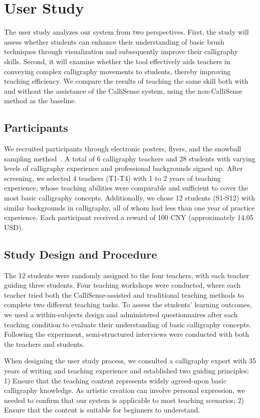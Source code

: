 \section{User Study}
The user study analyzes our system from two perspectives. First, the study will assess whether students can enhance their understanding of basic brush techniques through visualization and subsequently improve their calligraphy skills. Second, it will examine whether the tool effectively aids teachers in conveying complex calligraphy movements to students, thereby improving teaching efficiency. We compare the results of teaching the same skill both with and without the assistance of the CalliSense system, using the non-CalliSense method as the baseline.

\subsection{Participants}
We recruited participants through electronic posters, flyers, and the snowball sampling method~\cite{naderifar2017snowball}. A total of 6 calligraphy teachers and 28 students with varying levels of calligraphy experience and professional backgrounds signed up. After screening, we selected 4 teachers (T1-T4) with 1 to 2 years of teaching experience, whose teaching abilities were comparable and sufficient to cover the most basic calligraphy concepts. Additionally, we chose 12 students (S1-S12) with similar backgrounds in calligraphy, all of whom had less than one year of practice experience. Each participant received a reward of 100 CNY (approximately 14.05 USD).


\subsection{Study Design and Procedure}
The 12 students were randomly assigned to the four teachers, with each teacher guiding three students. Four teaching workshops were conducted, where each teacher tried both the CalliSense-assisted and traditional teaching methods to complete two different teaching tasks. To assess the students' learning outcomes, we used a within-subjects design and administered questionnaires after each teaching condition to evaluate their understanding of basic calligraphy concepts. Following the experiment, semi-structured interviews were conducted with both the teachers and students.

When designing the user study process, we consulted a calligraphy expert with 35 years of writing and teaching experience and established two guiding principles:
1) Ensure that the teaching content represents widely agreed-upon basic calligraphy knowledge. As artistic creation can involve personal expression, we needed to confirm that our system is applicable to most teaching scenarios;
2) Ensure that the content is suitable for beginners to understand.

